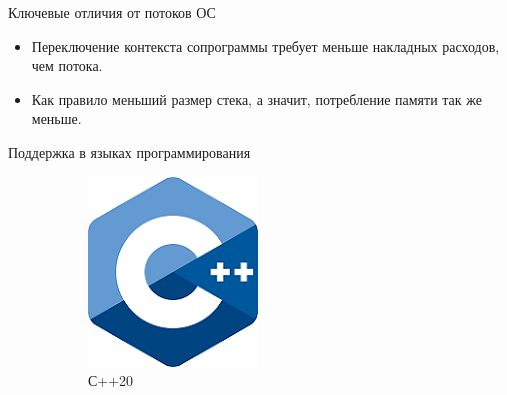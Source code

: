 \begin{frame}{Ключевые отличия от потоков ОС}
	\begin{itemize}
		\item Переключение контекста сопрограммы требует меньше накладных расходов, чем потока.
		\item Как правило меньший размер стека, а значит, потребление памяти так же меньше.
	\end{itemize}
\end{frame}

\begin{frame}{Поддержка в языках программирования}
	\begin{figure}
	\centering
	\hfill
	\begin{subfigure}[b]{0.22\linewidth}
		\includegraphics[width=\linewidth]{images/cpp.png}
		\caption{С++20}
	\end{subfigure}
	\hfill
	\begin{subfigure}[b]{0.25\linewidth}

\end{subfigure}
\end{figure}
\end{frame}
